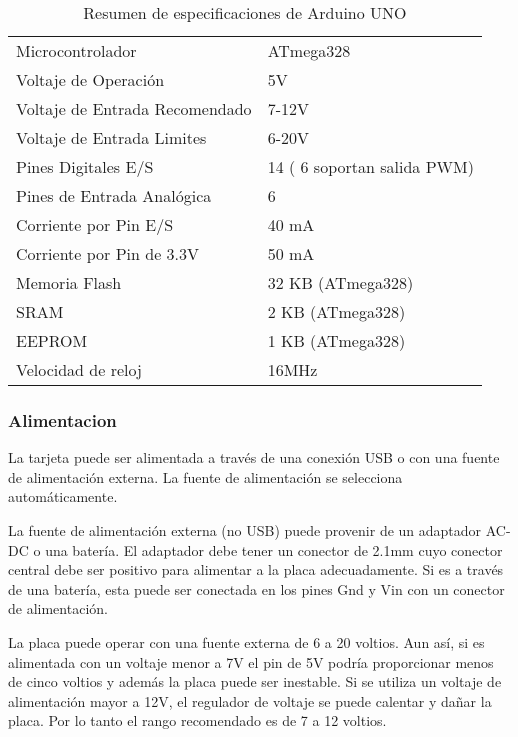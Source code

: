 \begin{table}[t]
    \centering
    \begin{tabular}{ll}
        \toprule
        Microcontrolador               & ATmega328\\ 
        Voltaje de Operación           & 5V\\ 
        Voltaje de Entrada Recomendado & 7-12V\\ 
        Voltaje de Entrada Limites     & 6-20V\\ 
        Pines Digitales E/S            & 14 ( 6 soportan salida PWM)\\ 
        Pines de Entrada Analógica     & 6\\ 
        Corriente por Pin E/S          & 40 mA\\ 
        Corriente por Pin de 3.3V      & 50 mA\\ 
        Memoria Flash                  & 32 KB (ATmega328)\\ 
        SRAM                           & 2 KB (ATmega328)\\ 
        EEPROM                         & 1 KB (ATmega328)\\
        Velocidad de reloj & 16MHz\\ \bottomrule
    \end{tabular}
    \caption{Resumen de especificaciones de Arduino UNO}
    \label{tab:arduino_specs}
\end{table}


\subsubsection{Alimentacion}
La tarjeta puede ser alimentada a través de una conexión USB o con una fuente de alimentación externa. La fuente de alimentación se selecciona automáticamente.



La fuente de alimentación externa (no USB) puede provenir de un adaptador AC-DC o una batería. El adaptador debe tener un conector de 2.1mm cuyo conector central debe ser positivo para alimentar a la placa adecuadamente. Si es a través de una batería, esta puede ser conectada en los pines Gnd y Vin con un conector de alimentación.


La placa puede operar con una fuente externa de 6 a 20 voltios. Aun así, si es alimentada con un voltaje menor a 7V el pin de 5V podría proporcionar menos de cinco voltios y además la placa puede ser inestable. Si se utiliza un voltaje de alimentación mayor a 12V, el regulador de voltaje se puede calentar y dañar la placa. Por lo tanto el rango recomendado es de 7 a 12 voltios.



